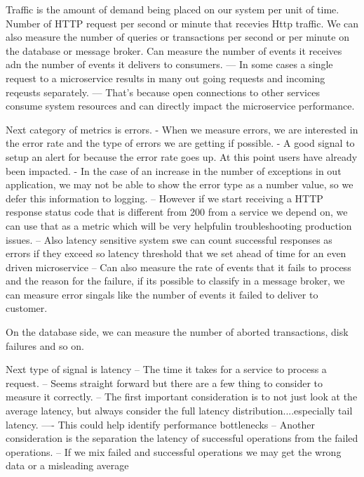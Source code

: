 \documentclass[a4paper, 11pt]{book}
\begin{document}
{    Traffic is the amount of demand being placed on our system per unit of time.
    Number of HTTP request per second or minute that recevies Http traffic.
    We can also measure the number of queries or transactions per second or per minute on the database or message broker.
    Can measure the number of events it receives adn the number of events it delivers to consumers.
    --- In some cases a single request to a microservice results in many out going requests and incoming reqeusts separately.
    --- That's because open connections to other services consume system resources and can directly impact the microservice performance.

    Next category of metrics is errors.
    - When we measure errors, we are interested in the error rate and the type of errors we are getting if possible.
    - A good signal to setup an alert for because the error rate goes up.
    At this point users have already been impacted.
    - In the case of an increase in the number of exceptions in out application, we may not be able to show the error type as a number value, so we defer this information to logging.
    -- However if we start receiving a HTTP response status code that is different from 200 from a service we depend on, we can use that as a metric which will be very helpfulin troubleshooting production issues.
    -- Also latency sensitive system swe can count successful responses as errors if they exceed so latency threshold that we set ahead of time for an even driven microservice
    -- Can also measure the rate of events that it fails to process and the reason for the failure, if its possible to classify in a message broker, we can measure error singals like the number of events it failed to deliver to customer.

    On the database side, we can measure the number of aborted transactions, disk failures and so on.

    Next type of signal is latency
    -- The time it takes for a service to process a request.
    -- Seems straight forward but there are a few thing to consider to measure it correctly.
    -- The first important consideration is to not just look at the average latency, but always consider the full latency distribution....especially tail latency.
    ---- This could help identify performance bottlenecks
    -- Another consideration is the separation the latency of successful operations from the failed operations.
    -- If we mix failed and successful operations we may get the wrong data or a misleading average

}
\end{document}
